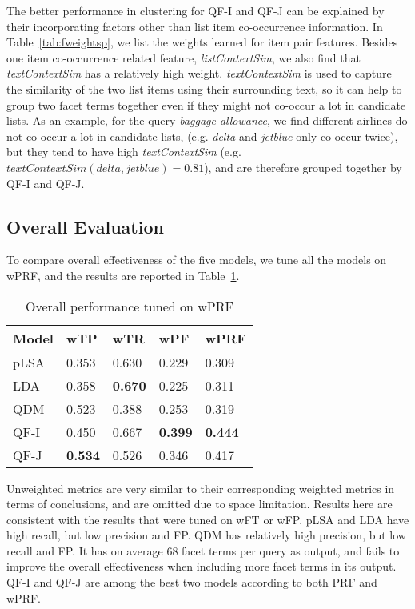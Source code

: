 The better performance in clustering for QF-I and QF-J can be explained by their incorporating factors other than list item co-occurrence information.
In Table~\ref{tab:fweightsp}, we list the weights learned for item pair features.
Besides one item co-occurrence related feature, \textit{listContextSim}, we also find that \textit{textContextSim} has a relatively high weight.
\textit{textContextSim} is used to capture the similarity of the two list items using their surrounding text, so it can help to group two facet terms together even if they might not co-occur a lot in candidate lists.
As an example, for the query \textit{baggage allowance}, we find different airlines do not co-occur a lot in candidate lists, (e.g. \textit{delta} and \textit{jetblue} only co-occur twice), but they tend to have high \textit{textContextSim} (e.g. $textContextSim(delta,jetblue)=0.81$), and are therefore grouped together by QF-I and QF-J.

\subsection{Overall Evaluation}
To compare overall effectiveness of the five models, we tune all the models on wPRF, and the results are reported in Table~\ref{tab:evalall}.
\begin{table}[ht!]
\centering
\caption{Overall performance tuned on wPRF}
\label{tab:evalall}
\begin{tabular}{|l|l|l|l|l|} \hline
Model &  wTP & wTR & wPF & wPRF \\\hline
pLSA & 0.353 & 0.630 & 0.229 & 0.309\\
LDA & 0.358 & \textbf{0.670} & 0.225 & 0.311\\
QDM & 0.523 & 0.388 & 0.253 & 0.319 \\
QF-I & 0.450 & 0.667 & \textbf{0.399} & \textbf{0.444}\\
QF-J & \textbf{0.534} & 0.526 & 0.346 & 0.417\\\hline
\end{tabular}
\end{table}

Unweighted metrics are very similar to their corresponding weighted metrics in terms of conclusions, and are omitted due to space limitation.
Results here are consistent with the results that were tuned on wFT or wFP.
pLSA and LDA have high recall, but low precision and FP.
QDM has relatively high precision, but low recall and FP. 
It has on average 68 facet terms per query as output, and fails to improve the overall effectiveness when including more facet terms in its output. 
QF-I and QF-J are among the best two models according to both PRF and wPRF.

